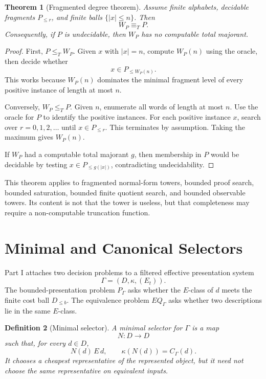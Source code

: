 \documentclass[11pt]{article}
\newtheorem{theorem}{Theorem}[section]
\newtheorem{definition}[theorem]{Definition}
\begin{document}
\begin{theorem}[Fragmented degree theorem]
Assume finite alphabets, decidable fragments \(P_{\leq r}\), and finite balls \(\{|x|\leq n\}\). Then
\[
W_P\equiv_T P.
\]
Consequently, if \(P\) is undecidable, then \(W_P\) has no computable total majorant.
\end{theorem}

\begin{proof}
First, \(P\leq_T W_P\). Given \(x\) with \(|x|=n\), compute \(W_P(n)\) using the oracle, then decide whether
\[
x\in P_{\leq W_P(n)}.
\]
This works because \(W_P(n)\) dominates the minimal fragment level of every positive instance of length at most \(n\).

Conversely, \(W_P\leq_T P\). Given \(n\), enumerate all words of length at most \(n\). Use the oracle for \(P\) to identify the positive instances. For each positive instance \(x\), search over \(r=0,1,2,\ldots\) until \(x\in P_{\leq r}\). This terminates by assumption. Taking the maximum gives \(W_P(n)\).

If \(W_P\) had a computable total majorant \(g\), then membership in \(P\) would be decidable by testing \(x\in P_{\leq g(|x|)}\), contradicting undecidability.
\end{proof}

This theorem applies to fragmented normal-form towers, bounded proof search, bounded saturation, bounded finite quotient search, and bounded observable towers. Its content is not that the tower is useless, but that completeness may require a non-computable truncation function.

\section{Minimal and Canonical Selectors}

Part I attaches two decision problems to a filtered effective presentation system
\[
\Gamma=(D,\kappa,(E_t)).
\]
The bounded-presentation problem \(P_\Gamma\) asks whether the \(E\)-class of \(d\) meets the finite cost ball \(D_{\leq b}\).  The equivalence problem \(EQ_\Gamma\) asks whether two descriptions lie in the same \(E\)-class.

\begin{definition}[Minimal selector]
A minimal selector for \(\Gamma\) is a map
\[
N:D\to D
\]
such that, for every \(d\in D\),
\[
N(d)\,E\,d,
\qquad
\kappa(N(d))=C_\Gamma(d).
\]
It chooses a cheapest representative of the represented object, but it need not choose the same representative on equivalent inputs.
\end{definition}
\end{document}
